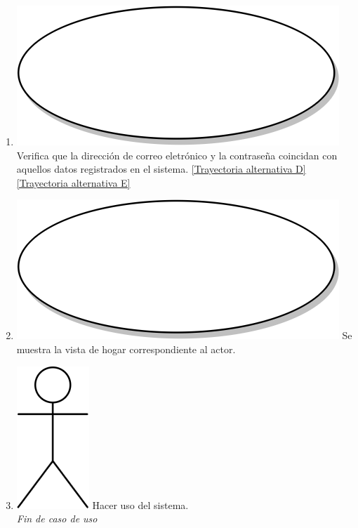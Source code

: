 \begin{enumerate}
  \item {\includegraphics[scale=.05]{Capitulo3/img/proceso.png} Verifica que la dirección de correo eletrónico y la contraseña coincidan con aquellos datos registrados en el sistema. \hyperref[cu1_ta_d]{[Trayectoria alternativa D]} \hyperref[cu1_ta_e]{[Trayectoria alternativa E]}}
  \item {\includegraphics[scale=.05]{Capitulo3/img/proceso.png} Se muestra la vista de hogar correspondiente al actor.}
  \item {\includegraphics[scale=.1]{Capitulo3/img/actor.png} Hacer uso del sistema.}\\
  \textit{Fin de caso de uso} \\	
\end{enumerate}

